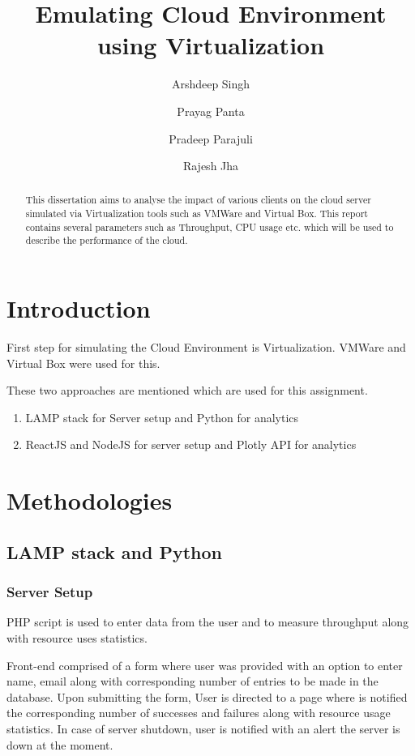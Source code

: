 \documentclass[11pt]{article}
\title{Emulating Cloud Environment using Virtualization}
\author{Arshdeep Singh \and Prayag Panta \and Pradeep Parajuli \and Rajesh Jha}
\date{}
\begin{document}
\maketitle

\begin{abstract}
This dissertation aims to analyse the impact of various clients on the cloud server simulated via Virtualization tools such as VMWare and Virtual Box. This report contains several parameters such as Throughput, CPU usage etc. which will be used to describe the performance of the cloud.
\end{abstract}

\section{Introduction}\label{section-introduction}
First step for simulating the Cloud Environment is Virtualization. VMWare and Virtual Box were used for this. 

These two approaches are mentioned which are used for this assignment.

\begin{enumerate}
  \item LAMP stack for Server setup and Python for analytics
  \item ReactJS and NodeJS for server setup and Plotly API for analytics
\end{enumerate}

\section{Methodologies}\label{methodologies}

\subsection{LAMP stack and Python}
\subsubsection{Server Setup}
PHP script is used to enter data from the user and to measure throughput along with resource uses statistics.\par
\vspace{.5em}
\justifying
    Front-end comprised of a form where user was provided with an option to enter name, email along with corresponding number of entries to be made in the database. Upon submitting the form, User is directed to a page where is notified the corresponding number of successes and failures along with resource usage statistics. In case of server shutdown, user is notified with an alert the server is down at the moment.\par
\end{document}
